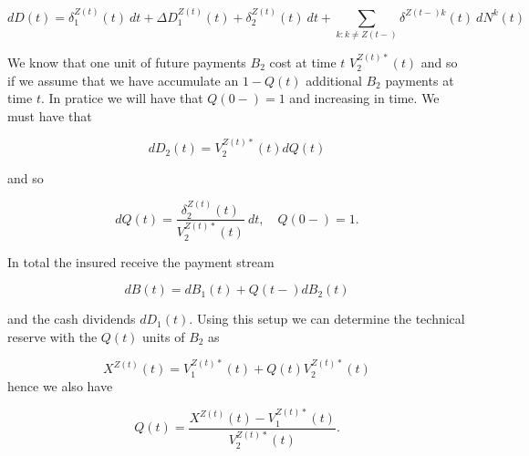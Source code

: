 \documentclass[a4paper,10pt,openany]{book}
\begin{document}
\[
dD(t)=\delta_1^{Z(t)}(t)\ dt+\Delta D_1^{Z(t)}(t)+ \delta_2^{Z(t)}(t)\ dt+\sum_{k:k\ne Z(t-)}\delta^{Z(t-)k}(t)\ dN^k(t) 
\]

We know that one unit of future payments \(B_2\) cost at time \(t\) \(V_2^{Z(t)*}(t)\) and so if we assume that we have accumulate an \(1-Q(t)\) additional \(B_2\) payments at time \(t\). In pratice we will have that \(Q(0-)=1\) and increasing in time. We must have that

\[
dD_2(t)=V^{Z(t)*}_2(t)dQ(t)
\]

and so

\[
dQ(t)=\frac{\delta_2^{Z(t)}(t)}{V_2^{Z(t)*}(t)}\ dt,\quad Q(0-)=1.
\]

In total the insured receive the payment stream

\[
dB(t)=dB_1(t)+Q(t-)dB_2(t)
\]

and the cash dividends \(dD_1(t)\). Using this setup we can determine the technical reserve with the \(Q(t)\) units of \(B_2\) as

\[
X^{Z(t)}(t)=V_1^{Z(t)*}(t)+Q(t)V_2^{Z(t)*}(t)
\]
hence we also have

\[
Q(t)=\frac{X^{Z(t)}(t)-V_1^{Z(t)*}(t)}{V_2^{Z(t)*}(t)}.
\]
\end{document}
